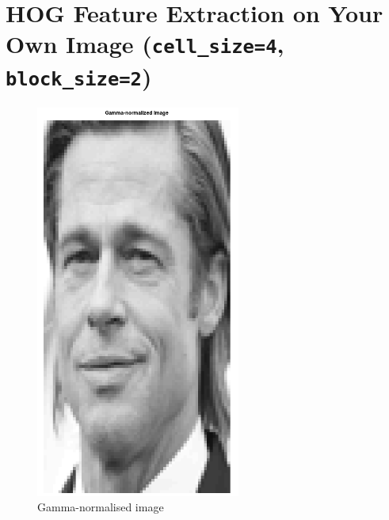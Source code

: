 \documentclass[a4paper]{article}
\begin{document}
\section{HOG Feature Extraction on Your Own Image (\texttt{cell_size=4}, \texttt{block_size=2})}
\noindent
\begin{minipage}{0.49\textwidth}
\begin{figure}[H]
    \centering
    \includegraphics[width=0.6\textwidth]{./images/1_gamma-normalised.png}
    \caption{Gamma-normalised image}
\end{figure}
\end{minipage}
\hfill
\end{document}
